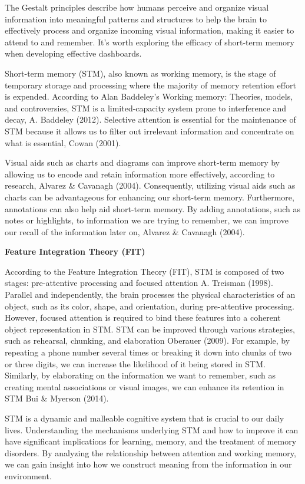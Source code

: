 \documentclass[print]{nuthesis}
\begin{document}
The Gestalt principles describe how humans perceive and organize visual information into meaningful patterns and structures to help the brain to effectively process and organize incoming visual information, making it easier to attend to and remember.
It's worth exploring the efficacy of short-term memory when developing effective dashboards.

Short-term memory (STM), also known as working memory, is the stage of temporary storage and processing where the majority of memory retention effort is expended.
According to Alan Baddeley's Working memory: Theories, models, and controversies, STM is a limited-capacity system prone to interference and decay, A. Baddeley (2012).
Selective attention is essential for the maintenance of STM because it allows us to filter out irrelevant information and concentrate on what is essential, Cowan (2001).

Visual aids such as charts and diagrams can improve short-term memory by allowing us to encode and retain information more effectively, according to research, Alvarez \& Cavanagh (2004).
Consequently, utilizing visual aids such as charts can be advantageous for enhancing our short-term memory.
Furthermore, annotations can also help aid short-term memory.
By adding annotations, such as notes or highlights, to information we are trying to remember, we can improve our recall of the information later on, Alvarez \& Cavanagh (2004).

\textbf{Feature Integration Theory (FIT)}

According to the Feature Integration Theory (FIT), STM is composed of two stages: pre-attentive processing and focused attention A. Treisman (1998).
Parallel and independently, the brain processes the physical characteristics of an object, such as its color, shape, and orientation, during pre-attentive processing.
However, focused attention is required to bind these features into a coherent object representation in STM.
STM can be improved through various strategies, such as rehearsal, chunking, and elaboration Oberauer (2009).
For example, by repeating a phone number several times or breaking it down into chunks of two or three digits, we can increase the likelihood of it being stored in STM.
Similarly, by elaborating on the information we want to remember, such as creating mental associations or visual images, we can enhance its retention in STM Bui \& Myerson (2014).

STM is a dynamic and malleable cognitive system that is crucial to our daily lives.
Understanding the mechanisms underlying STM and how to improve it can have significant implications for learning, memory, and the treatment of memory disorders.
By analyzing the relationship between attention and working memory, we can gain insight into how we construct meaning from the information in our environment.
\end{document}
